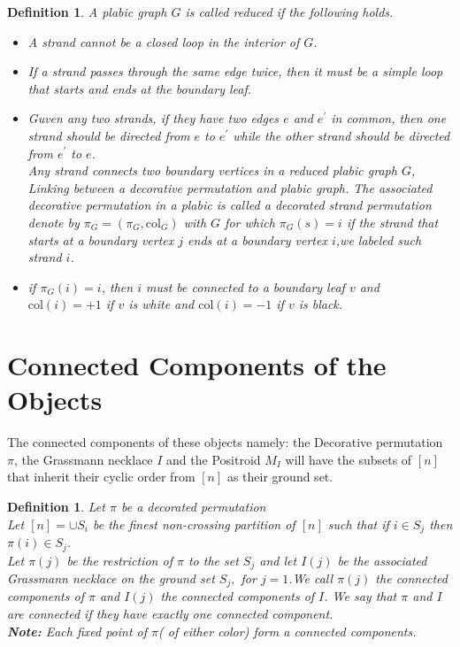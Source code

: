 \documentclass[12pt]{report}
\theoremstyle{theorem}
\newtheorem{definition}[theorem]{Definition}
\begin{document}
\begin{definition}
\normalfont A plabic graph $G$ is called reduced if the following holds.
\begin{itemize}
\item A strand cannot be a closed loop in the interior of $G$.
\item If a strand passes through the same edge twice, then it must be a simple loop that starts and ends at the boundary leaf.
\item Guven any two strands, if they have two edges $e$ and $e^\prime$ in common, then one strand should be directed from $e$ to $e^\prime$ while the other strand should be directed from $e^\prime$ to $e$.\\

Any strand connects two  boundary vertices in a reduced plabic graph $G$, Linking between a decorative permutation and plabic graph.
The associated decorative permutation in a plabic is called a decorated strand permutation denote by $\pi_G = (\pi_G, \mbox{col}_G)$ with $G$ for which $\pi_G(s) = i$ if the strand that starts at a boundary vertex $j$ ends at a boundary vertex $i$,we labeled such strand $i$.
\item if $\pi_G(i) = i$, then $i$ must be connected to a  boundary leaf $v$ and $\mbox{col}(i) = +1$ if $v$ is white and $\mbox{col}(i) = -1$ if $v$ is black. 
\end{itemize}
\end{definition}



\section*{Connected Components of the Objects}
The connected components of these objects namely: the Decorative permutation $\pi$, the Grassmann necklace $I$ and the Positroid $M_I$ will have the subsets of $[n]$ that inherit their cyclic order from $[n]$ as their ground set.

\begin{definition}
\normalfont Let $\pi$ be a decorated permutation\\
Let $[n] = \cup S_i$ be the finest non-crossing partition of $[n]$ such that if $i\in S_j$ then $\pi(i)\in S_j$.\\
Let $\pi(j)$ be the restriction of $\pi$ to the set $S_j$ and let $I(j)$ be the associated Grassmann necklace on the ground set $S_j,$ for $j = 1$.We call $\pi(j)$ the connected components of $\pi$ and $I(j)$ the connected components of $I$. We say that $\pi$ and $I$ are connected if they have exactly one connected component.\\
\textbf{Note:} Each fixed point of $\pi$( of either color) form a connected components.
\end{definition}
\end{document}
